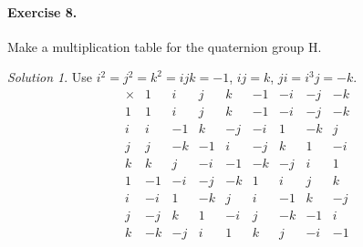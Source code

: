 \documentclass[11pt]{report}
\theoremstyle{remark}
\newtheorem*{solution}{Solution}
\begin{document}
    \paragraph{Exercise 8.} Make a multiplication table for the quaternion group H.
    \begin{solution}
        Use $i^2 = j^2 = k^2 = ijk = -1$, $ij = k$, $ji = i^3j = -k$.
        \[
            \begin{array}{c|cccccccc}
                \times  & 1  & i  & j  & k  & -1 & -i & -j & -k \\\hline
                1       & 1  & i  & j  & k  & -1 & -i & -j & -k \\
                i       & i  & -1 & k  & -j & -i & 1  & -k & j  \\
                j       & j  & -k & -1 & i  & -j & k  & 1  & -i \\
                k       & k  & j  & -i & -1 & -k & -j & i  & 1  \\
                1       & -1 & -i & -j & -k &  1 &  i &  j &  k \\
                i       & -i & 1  & -k &  j &  i & -1 &  k & -j \\
                j       & -j & k  & 1  & -i &  j & -k & -1 &  i \\
                k       & -k & -j & i  & 1  &  k &  j & -i & -1 \\
            \end{array} 
        \] 
    \end{solution}
\end{document}
